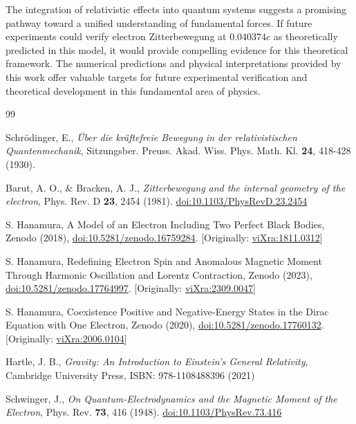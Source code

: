 \documentclass[%
 reprint,
 amsmath,amssymb,
 aps,
]{revtex4-1}
\numberwithin{equation}{section}%
\begin{document}
The integration of relativistic effects into quantum systems suggests a promising pathway toward a unified understanding of fundamental forces. If future experiments could verify electron Zitterbewegung at $0.040374c$ as theoretically predicted in this model, it would provide compelling evidence for this theoretical framework. The numerical predictions and physical interpretations provided by this work offer valuable targets for future experimental verification and theoretical development in this fundamental area of physics.

\begin{thebibliography}{99}

Schrödinger, E.,
\textit{Über die kräftefreie Bewegung in der relativistischen Quantenmechanik},
Sitzungsber. Preuss. Akad. Wiss. Phys. Math. Kl. \textbf{24}, 418-428 (1930).

Barut, A. O., \& Bracken, A. J.,
\textit{Zitterbewegung and the internal geometry of the electron},
Phys. Rev. D \textbf{23}, 2454 (1981).
\href{https://doi.org/10.1103/PhysRevD.23.2454}{doi:10.1103/PhysRevD.23.2454}

S. Hanamura, A Model of an Electron Including Two Perfect Black Bodies, Zenodo (2018), \href{https://doi.org/10.5281/zenodo.16759284}{doi:10.5281/zenodo.16759284}. [Originally: \href{http://vixra.org/abs/1811.0312}{viXra:1811.0312}]

S. Hanamura, Redefining Electron Spin and Anomalous Magnetic Moment Through Harmonic Oscillation and Lorentz Contraction, Zenodo (2023), \href{https://doi.org/10.5281/zenodo.17764997}{doi:10.5281/zenodo.17764997}. [Originally: \href{https://vixra.org/abs/2309.0047}{viXra:2309.0047}]

S. Hanamura, Coexistence Positive and Negative-Energy States in the Dirac Equation with One Electron, Zenodo (2020), \href{https://doi.org/10.5281/zenodo.17760132}{doi:10.5281/zenodo.17760132}. [Originally: \href{https://vixra.org/abs/2006.0104}{viXra:2006.0104}]

Hartle, J. B.,
\textit{Gravity: An Introduction to Einstein's General Relativity},
Cambridge University Press,
ISBN: 978-1108488396 (2021)

Schwinger, J.,
\textit{On Quantum-Electrodynamics and the Magnetic Moment of the Electron},
Phys. Rev. \textbf{73}, 416 (1948).
\href{https://doi.org/10.1103/PhysRev.73.416}{doi:10.1103/PhysRev.73.416}


\end{thebibliography}
\end{document}
